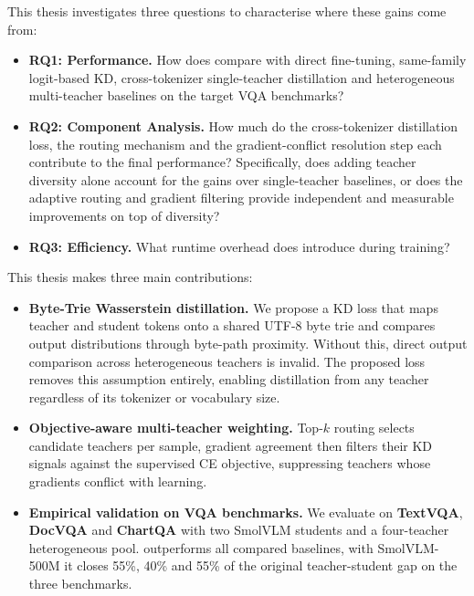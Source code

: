 This thesis investigates three
questions to characterise where these gains come from:

\begin{itemize}
\item \textbf{RQ1: Performance.} How does \methodname{} compare with direct
fine-tuning, same-family logit-based KD, cross-tokenizer single-teacher
distillation and heterogeneous multi-teacher baselines on the target VQA
benchmarks?

\newpage{}

\item \textbf{RQ2: Component Analysis.} How much do the cross-tokenizer
distillation loss, the routing mechanism and the gradient-conflict resolution
step each contribute to the final performance? Specifically, does adding
teacher diversity alone account for the gains over single-teacher baselines,
or does the adaptive routing and gradient filtering provide independent
and measurable improvements on top of diversity?
\item \textbf{RQ3: Efficiency.} What runtime overhead does \methodname{}
introduce during training?
\end{itemize}

This thesis makes three main contributions:

\begin{itemize}
    \item \textbf{Byte-Trie Wasserstein distillation.}
    We propose a KD loss that maps teacher and student tokens onto a shared
    UTF-8 byte trie and compares output distributions through byte-path
    proximity. Without this, direct output comparison across heterogeneous
    teachers is invalid. The proposed loss removes this assumption entirely, enabling
    distillation from any teacher regardless of its tokenizer or vocabulary
    size.

    \item \textbf{Objective-aware multi-teacher weighting.}
    Top-\(k\) routing selects candidate teachers per sample, gradient
    agreement then filters their KD signals against the supervised CE
    objective, suppressing teachers whose gradients conflict with learning.

    \item \textbf{Empirical validation on VQA benchmarks.}
    We evaluate \methodname{} on \textbf{TextVQA}, \textbf{DocVQA} and
    \textbf{ChartQA} with two SmolVLM students and a four-teacher
    heterogeneous pool. \methodname{} outperforms all compared baselines,
    with SmolVLM-500M it closes 55\%, 40\% and 55\% of the original
    teacher-student gap on the three benchmarks. 
\end{itemize}


